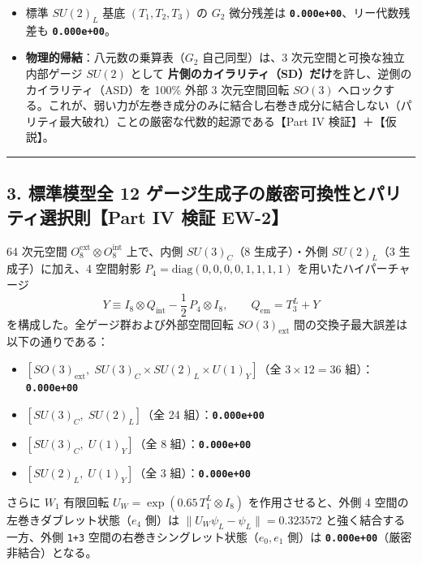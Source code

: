 \documentclass[
  a4paper,
]{ltjsarticle}
\providecommand{\tightlist}{%
  \setlength{\itemsep}{0pt}\setlength{\parskip}{0pt}}
\begin{document}
\begin{itemize}
\tightlist
\item
  標準 \(SU(2)_L\) 基底 \((T_1, T_2, T_3)\) の \(G_2\) 微分残差は
  \textbf{\texttt{0.000e+00}}、リー代数残差も
  \textbf{\texttt{0.000e+00}}。
\item
  \textbf{物理的帰結}：八元数の乗算表（\(G_2\) 自己同型）は、3
  次元空間と可換な独立内部ゲージ \(SU(2)\) として
  \textbf{片側のカイラリティ（SD）だけ}を許し、逆側のカイラリティ（ASD）を
  100\% 外部 3 次元空間回転 \(SO(3)\)
  へロックする。これが、弱い力が左巻き成分のみに結合し右巻き成分に結合しない（パリティ最大破れ）ことの厳密な代数的起源である【Part
  IV 検証】＋【仮説】。
\end{itemize}

\begin{center}\rule{0.5\linewidth}{0.5pt}\end{center}

\subsection{3. 標準模型全 12
ゲージ生成子の厳密可換性とパリティ選択則【Part IV 検証
EW-2】}\label{ux6a19ux6e96ux6a21ux578bux5168-12-ux30b2ux30fcux30b8ux751fux6210ux5b50ux306eux53b3ux5bc6ux53efux63dbux6027ux3068ux30d1ux30eaux30c6ux30a3ux9078ux629eux5247part-iv-ux691cux8a3c-ew-2}

64 次元空間 \(O_8^{\mathrm{ext}} \otimes O_8^{\mathrm{int}}\) 上で、内側
\(SU(3)_C\)（8 生成子）・外側 \(SU(2)_L\)（3 生成子）に加え、4 空間射影
\(P_4 = \mathrm{diag}(0,0,0,0,1,1,1,1)\) を用いたハイパーチャージ
\[Y \equiv I_8 \otimes Q_{\mathrm{int}} - \frac{1}{2}\, P_4 \otimes I_8, \qquad Q_{\mathrm{em}} = T_3^L + Y \tag{1}\]
を構成した。全ゲージ群および外部空間回転 \(SO(3)_{\mathrm{ext}}\)
間の交換子最大誤差は以下の通りである：

\begin{itemize}
\tightlist
\item
  \([SO(3)_{\mathrm{ext}},\; SU(3)_C \times SU(2)_L \times U(1)_Y]\)（全
  \(3 \times 12 = 36\) 組）：\textbf{\texttt{0.000e+00}}
\item
  \([SU(3)_C,\; SU(2)_L]\)（全 24 組）：\textbf{\texttt{0.000e+00}}
\item
  \([SU(3)_C,\; U(1)_Y]\)（全 8 組）：\textbf{\texttt{0.000e+00}}
\item
  \([SU(2)_L,\; U(1)_Y]\)（全 3 組）：\textbf{\texttt{0.000e+00}}
\end{itemize}

さらに \(W_1\) 有限回転 \(U_W = \exp(0.65\, T_1^L \otimes I_8)\)
を作用させると、外側 4 空間の左巻きダブレット状態（\(e_4\) 側）は
\(\|U_W\psi_L - \psi_L\| = \mathbf{0.323572}\) と強く結合する一方、外側
\texttt{1+3} 空間の右巻きシングレット状態（\(e_0, e_1\) 側）は
\textbf{\texttt{0.000e+00}}（厳密非結合）となる。
\end{document}
